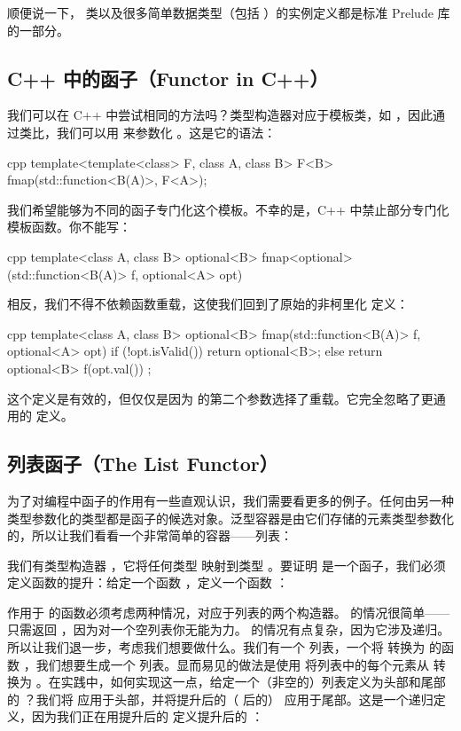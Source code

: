 顺便说一下， 类以及很多简单数据类型（包括 ）的实例定义都是标准 Prelude 库的一部分。

\subsection{C++ 中的函子（Functor in C++）}

我们可以在 C++ 中尝试相同的方法吗？类型构造器对应于模板类，如 ，因此通过类比，我们可以用  来参数化 。这是它的语法：

\begin{snip}{cpp}
  template<template<class> F, class A, class B>
  F<B> fmap(std::function<B(A)>, F<A>);
\end{snip}
我们希望能够为不同的函子专门化这个模板。不幸的是，C++ 中禁止部分专门化模板函数。你不能写：

\begin{snip}{cpp}
  template<class A, class B>
  optional<B> fmap<optional>(std::function<B(A)> f, optional<A> opt)
\end{snip}
相反，我们不得不依赖函数重载，这使我们回到了原始的非柯里化  定义：

\begin{snip}{cpp}
  template<class A, class B>
  optional<B> fmap(std::function<B(A)> f, optional<A> opt) {
    if (!opt.isValid())
    return optional<B>{};
    else
    return optional<B>{ f(opt.val()) };
  }
\end{snip}
这个定义是有效的，但仅仅是因为  的第二个参数选择了重载。它完全忽略了更通用的  定义。

\subsection{列表函子（The List Functor）}

为了对编程中函子的作用有一些直观认识，我们需要看更多的例子。任何由另一种类型参数化的类型都是函子的候选对象。泛型容器是由它们存储的元素类型参数化的，所以让我们看看一个非常简单的容器——列表：

我们有类型构造器 ，它将任何类型  映射到类型 。要证明  是一个函子，我们必须定义函数的提升：给定一个函数 ，定义一个函数 ：

作用于  的函数必须考虑两种情况，对应于列表的两个构造器。 的情况很简单——只需返回 ，因为对一个空列表你无能为力。 的情况有点复杂，因为它涉及递归。所以让我们退一步，考虑我们想要做什么。我们有一个  列表，一个将  转换为  的函数 ，我们想要生成一个  列表。显而易见的做法是使用  将列表中的每个元素从  转换为 。在实践中，如何实现这一点，给定一个（非空的）列表定义为头部和尾部的 ？我们将  应用于头部，并将提升后的（ 后的） 应用于尾部。这是一个递归定义，因为我们正在用提升后的  定义提升后的 ：

